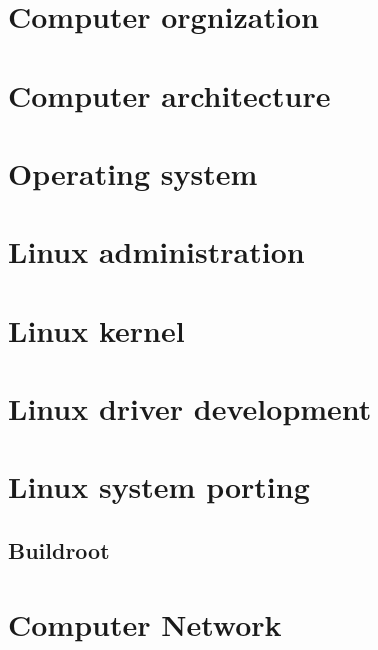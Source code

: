\documentclass[UTF8]{ctexbook}
\begin{document}
	\part{Computer orgnization}
	
	\part{Computer architecture}
	
	\begin{comment} 
	rather stupid, but helpful 
	\chapter{Microcontroller}
	\chapter{Digital signal processor}
	\chapter{ARM processor}
	\end{comment}

	\part{Operating system}
	
	\part{Linux administration}
	
	\part{Linux kernel}
	
	\part{Linux driver development}
	
	\part{Linux system porting}
	\chapter{Buildroot}
	
	\part{Computer Network}
\end{document}
